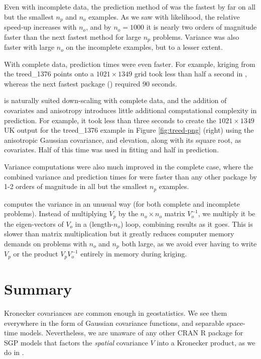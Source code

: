 Even with incomplete data, the prediction method of  was the fastest by far on all but the smallest \(n_p\) and \(n_o\) examples. As we saw with likelihood, the relative speed-up increases with \(n_o\), and by \(n_o=1000\) it is nearly two orders of magnitude faster than the next fastest method for large \(n_p\) problems. Variance was also faster with large \(n_o\) on the incomplete examples, but to a lesser extent.

With complete data, prediction times were even faster. For example, kriging from the treed\_1376 points onto a \(1021 \times 1349\) grid took less than half a second in , whereas the next fastest package () required 90 seconds.

 is naturally suited down-scaling with complete data, and the addition of covariates and anisotropy introduces little additional computational complexity in prediction. For example, it took less than three seconds to create the \(1021 \times 1349\) UK output for the treed\_1376 example in Figure \ref{fig:treed-png} (right) using the anisotropic Gaussian covariance, and elevation, along with its square root, as covariates. Half of this time was used in fitting and half in prediction.

Variance computations were also much improved in the complete case, where the combined variance and prediction times for  were faster than any other package by 1-2 orders of magnitude in all but the smallest \(n_p\) examples.

 computes the variance in an unusual way (for both complete and incomplete problems). Instead of multiplying \(V_p\) by the \(n_o \times n_o\) matrix \(V_o^{-1}\), we multiply it be the eigen-vectors of \(V_o\) in a (length-\(n_o\)) loop, combining results as it goes. This is slower than matrix multiplication but it greatly reduces computer memory demands on problems with \(n_o\) and \(n_p\) both large, as we avoid ever having to write \(V_p\) or the product \(V_p V_o^{-1}\) entirely in memory during kriging.

\hypertarget{summary}{%
\section{Summary}\label{summary}}

Kronecker covariances are common enough in geostatistics. We see them everywhere in the form of Gaussian covariance functions, and separable space-time models. Nevertheless, we are unaware of any other CRAN R package for SGP models that factors the \emph{spatial} covariance \(V\) into a Kronecker product, as we do in .

